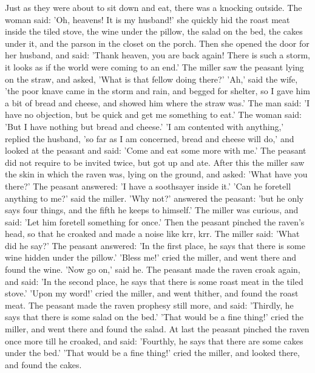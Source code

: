 \documentclass[12pt]{book}
\begin{document}
Just as they were about to sit down and eat, there was a knocking
outside. The woman said: 'Oh, heavens! It is my husband!' she quickly
hid the roast meat inside the tiled stove, the wine under the pillow,
the salad on the bed, the cakes under it, and the parson in the closet
on the porch. Then she opened the door for her husband, and said:
'Thank heaven, you are back again! There is such a storm, it looks as
if the world were coming to an end.' The miller saw the peasant lying
on the straw, and asked, 'What is that fellow doing there?' 'Ah,' said
the wife, 'the poor knave came in the storm and rain, and begged for
shelter, so I gave him a bit of bread and cheese, and showed him where
the straw was.' The man said: 'I have no objection, but be quick and
get me something to eat.' The woman said: 'But I have nothing but
bread and cheese.' 'I am contented with anything,' replied the
husband, 'so far as I am concerned, bread and cheese will do,' and
looked at the peasant and said: 'Come and eat some more with me.' The
peasant did not require to be invited twice, but got up and ate. After
this the miller saw the skin in which the raven was, lying on the
ground, and asked: 'What have you there?' The peasant answered: 'I
have a soothsayer inside it.' 'Can he foretell anything to me?' said
the miller. 'Why not?' answered the peasant: 'but he only says four
things, and the fifth he keeps to himself.' The miller was curious,
and said: 'Let him foretell something for once.' Then the peasant
pinched the raven's head, so that he croaked and made a noise like
krr, krr. The miller said: 'What did he say?' The peasant answered:
'In the first place, he says that there is some wine hidden under the
pillow.' 'Bless me!' cried the miller, and went there and found the
wine. 'Now go on,' said he. The peasant made the raven croak again,
and said: 'In the second place, he says that there is some roast meat
in the tiled stove.' 'Upon my word!' cried the miller, and went
thither, and found the roast meat. The peasant made the raven prophesy
still more, and said: 'Thirdly, he says that there is some salad on
the bed.' 'That would be a fine thing!' cried the miller, and went
there and found the salad. At last the peasant pinched the raven once
more till he croaked, and said: 'Fourthly, he says that there are some
cakes under the bed.' 'That would be a fine thing!' cried the miller,
and looked there, and found the cakes.
\end{document}
